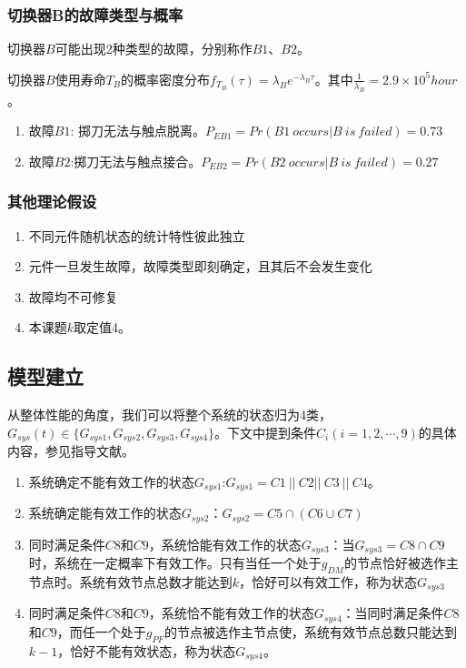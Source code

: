 \documentclass[10.5pt,twocolumn]{jbuaa}
\begin{document}
\subsubsection{切换器B的故障类型与概率}
切换器$B$可能出现2种类型的故障，分别称作$B1$、$B2$。

切换器$B$使用寿命$T_B$的概率密度分布$f_{T_B}(\tau) = \lambda_B e^{-\lambda_B \tau}$。其中$\frac{1}{\lambda_B} = 2.9 \times 10^ 5 hour$。
\begin{enumerate}
	\item 故障$B1$: 掷刀无法与触点脱离。$P_{EB1} = Pr(B1\ occurs | B\ is\ failed) = 0.73$
	\item 故障$B2$:掷刀无法与触点接合。$P_{EB2} = Pr(B2\ occurs | B\ is\ failed) = 0.27$
\end{enumerate}
\subsubsection{其他理论假设}
\begin{enumerate}
	\item 不同元件随机状态的统计特性彼此独立
	\item 元件一旦发生故障，故障类型即刻确定，且其后不会发生变化
	\item 故障均不可修复
	\item 本课题$k$取定值4。
\end{enumerate}
\subsection{模型建立}
从整体性能的角度，我们可以将整个系统的状态归为4类，$G_{sys}(t)\in \{G_{sys1}, G_{sys2}, G_{sys3}, G_{sys4}\}$。下文中提到条件$C_i (i = 1, 2, \cdots , 9)$的具体内容，参见指导文献\cite{cite1}。
\begin{enumerate}
	\item 系统确定不能有效工作的状态$G_{sys1}$:\quad $G_{sys1} = C1\ ||\ C2 ||\ C3 \ || \ C4$。
	\item 系统确定能有效工作的状态$G_{sys2}$：\quad $G_{sys2} = C5 \cap (C6 \cup C7)$
	\item 同时满足条件$C8$和$C9$，系统恰能有效工作的状态$G_{sys3}$：当$G_{sys3} = C8 \cap C9$时，系统在一定概率下有效工作。只有当任一个处于$g_{DM}$的节点恰好被选作主节点时。系统有效节点总数才能达到$k$，恰好可以有效工作，称为状态$G_{sys3}$
	\item 同时满足条件$C8$和$C9$，系统恰不能有效工作的状态$G_{sys4}$：当同时满足条件$C8$和$C9$，而任一个处于$g_{PF}$的节点被选作主节点使，系统有效节点总数只能达到$k - 1$，恰好不能有效状态，称为状态$G_{sys4}$。
\end{enumerate}
\end{document}
